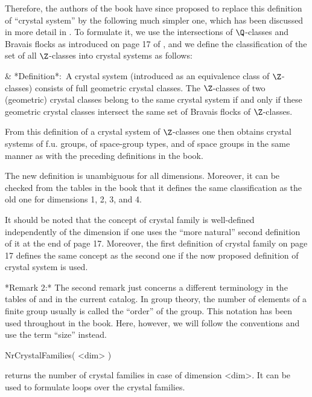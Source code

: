 Therefore,  the authors of  the book have  since proposed to replace this
definition of ``crystal system''  by the  following much simpler  one,
which has been discussed in more detail in \cite{NPW81}. To formulate it,
we use    the   intersections  of $\Q$-classes    and  Bravais  flocks as
introduced on page 17 of \cite{BBNWZ78}, and we define the classification
of the set of all $\Z$-classes into crystal systems as follows:

\beginitems
& *Definition*:\  A crystal system  (introduced as an  equivalence
  class  of   $\Z$-classes)   consists of  full  geometric  crystal
  classes.  The $\Z$-classes  of  two  (geometric)  crystal classes
  belong to the same crystal system  if and only if these geometric
  crystal  classes  intersect  the same  set of  Bravais  flocks of
  $\Z$-classes.
\enditems

From  this  definition  of  a  crystal system  of  $\Z$-classes  one then
obtains  crystal systems of f.u.  groups,  of space-group types, and of
space groups in the same manner as with the  preceding definitions in the
book.

The new definition is unambiguous for all dimensions. Moreover, it can be
checked  from  the   tables   in the  book   that  it   defines  the same
classification as the old one for dimensions 1, 2, 3, and 4.

It should  be noted that  the concept of  crystal  family is well-defined
independently of the dimension if one uses the ``more natural'' second
definition of it at the end of page 17. Moreover, the first definition of
crystal family on page  17 defines the same concept  as the second one if
the now proposed definition of crystal system is used.


*Remark 2:*
The second remark just concerns a  different terminology in the tables of
\cite{BBNWZ78} and in the current catalog. In group theory, the number of
elements of a  finite group  usually is  called  the ``order'' of  the
group.   This notation has  been  used throughout   in  the book.   Here,
however,  we  will follow the    {\GAP}   conventions and use  the   term
``size'' instead.



\>NrCrystalFamilies( <dim> )

returns the number of crystal families in case of dimension <dim>.  It
can be used to formulate loops over the crystal families.

